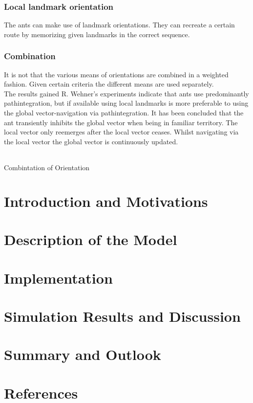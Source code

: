 \documentclass[11pt]{article}
\begin{document}
\subsubsection{Local landmark orientation }
The ants can make use of landmark orientations. They can recreate a certain route by memorizing given landmarks in the correct sequence.

\subsubsection{Combination}
It is not that the various means of orientations are combined in a weighted fashion. Given certain criteria the different means are used separately.\\
The results gained R. Wehner's experiments indicate that ants use predominantly pathintegration, but if available using local landmarks is more preferable to using the global vector-navigation via pathintegration. It has been concluded that the ant transiently inhibits the global vector when being in familiar territory. The local vector only reemerges after the local vector ceases. Whilst navigating via the local vector the global vector is continuously updated.
\\ \

\begin{algorithm}[H]

 \caption{Combintation of Orientation}
\end{algorithm}

















\newpage
\section{Introduction and Motivations}

\section{Description of the Model}

\section{Implementation}

\section{Simulation Results and Discussion}

\section{Summary and Outlook}

\section{References}
\end{document}

